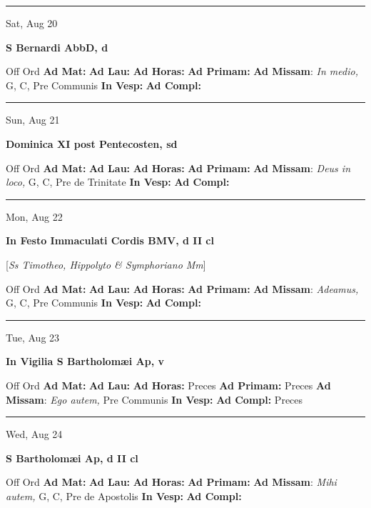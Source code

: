 \documentclass[letterpaper, 10pt]{article}
\begin{document}
\hrule
\begin{center}
Sat, Aug 20
\end{center}\textbf{ \large S Bernardi AbbD, \textnormal{\normalsize d}}
\begin{justify}
Off Ord
\textbf{Ad Mat: }
\textbf{Ad Lau: }
\textbf{Ad Horas: }
\textbf{Ad Primam: }
\textbf{Ad Missam}: \textit{In medio,} G, C, Pre Communis
\textbf{In Vesp: }
\textbf{Ad Compl: }\end{justify}



\hrule
\begin{center}
Sun, Aug 21
\end{center}\textbf{ \large Dominica XI post Pentecosten, \textnormal{\normalsize sd}}
\begin{justify}
Off Ord
\textbf{Ad Mat: }
\textbf{Ad Lau: }
\textbf{Ad Horas: }
\textbf{Ad Primam: }
\textbf{Ad Missam}: \textit{Deus in loco,} G, C, Pre de Trinitate
\textbf{In Vesp: }
\textbf{Ad Compl: }\end{justify}



\hrule
\begin{center}
Mon, Aug 22
\end{center}\textbf{ \large In Festo Immaculati Cordis BMV, \textnormal{\normalsize d II cl}}

[\textit{Ss Timotheo, Hippolyto \& Symphoriano Mm}]
\begin{justify}
Off Ord
\textbf{Ad Mat: }
\textbf{Ad Lau: }
\textbf{Ad Horas: }
\textbf{Ad Primam: }
\textbf{Ad Missam}: \textit{Adeamus,} G, C, Pre Communis
\textbf{In Vesp: }
\textbf{Ad Compl: }\end{justify}



\hrule
\begin{center}
Tue, Aug 23
\end{center}\textbf{ \large In Vigilia S Bartholomæi Ap, \textnormal{\normalsize v}}
\begin{justify}
Off Ord
\textbf{Ad Mat: }
\textbf{Ad Lau: }
\textbf{Ad Horas: }Preces
\textbf{Ad Primam: }Preces
\textbf{Ad Missam}: \textit{Ego autem,} Pre Communis
\textbf{In Vesp: }
\textbf{Ad Compl: }Preces\end{justify}



\hrule
\begin{center}
Wed, Aug 24
\end{center}\textbf{ \large S Bartholomæi Ap, \textnormal{\normalsize d II cl}}
\begin{justify}
Off Ord
\textbf{Ad Mat: }
\textbf{Ad Lau: }
\textbf{Ad Horas: }
\textbf{Ad Primam: }
\textbf{Ad Missam}: \textit{Mihi autem,} G, C, Pre de Apostolis
\textbf{In Vesp: }
\textbf{Ad Compl: }\end{justify}
\end{document}

